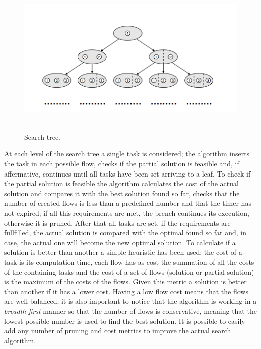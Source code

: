 \documentclass[a4paper,11pt,oneside]{book}
\begin{document}
\begin{figure}[H]
\centering
\includegraphics[width = 130mm, height = 76mm]{search_tree.png}
\caption{Search tree.}
\label{search_tree}
\end{figure}

At each level of the search tree a single task is considered; the algorithm inserts the task in each possible flow, checks if the partial solution is feasible and, if affermative, continues until all tasks have been set arriving to a leaf. To check if the partial solution is feasible the algorithm calculates the cost of the actual solution and compares it with the best solution found so far, checks that the number of created flows is less than a predefined number and that the timer has not expired; if all this requirements are met, the brench continues its execution, otherwise it is pruned. After that all tasks are set, if the requirements are fullfilled, the actual solution is compared with the optimal found so far and, in case, the actual one will become the new optimal solution. To calculate if a solution is better than another a simple heuristic has been used: the cost of a task is its computation time, each flow has as cost the summation of all the costs of the containing tasks and the cost of a set of flows (solution or partial solution) is the maximum of the costs of the flows. Given this metric a solution is better than another if it has a lower cost. Having a low flow cost means that the flows are well balanced; it is also important to notice that the algorithm is working in a \emph{breadth-first} manner so that the number of flows is conservative, meaning that the lowest possible number is used to find the best solution. It is possible to easily add any number of pruning and cost metrics to improve the actual search algorithm.
\end{document}
